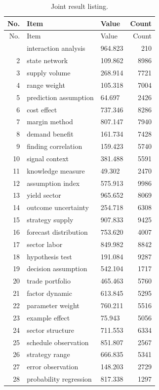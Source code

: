 \documentclass[11pt]{report}
\begin{document}
\begin{longtable}{rllr}\caption{Joint result listing.}\label{tab:l4}\\\toprule No. & Item & Value & Count \\ \midrule \endfirsthead\toprule No. & Item & Value & Count \\ \midrule \endhead\bottomrule \endfoot
1 & interaction analysis & 964.823 & 210 \\
2 & state network & 109.862 & 8986 \\
3 & supply volume & 268.914 & 7721 \\
4 & range weight & 105.318 & 7004 \\
5 & prediction assumption & 64.697 & 2426 \\
6 & cost effect & 737.346 & 8286 \\
7 & margin method & 807.147 & 7940 \\
8 & demand benefit & 161.734 & 7428 \\
9 & finding correlation & 159.423 & 5740 \\
10 & signal context & 381.488 & 5591 \\
11 & knowledge measure & 49.302 & 2470 \\
12 & assumption index & 575.913 & 9986 \\
13 & yield sector & 965.652 & 8069 \\
14 & outcome uncertainty & 254.718 & 6308 \\
15 & strategy supply & 907.833 & 9425 \\
16 & forecast distribution & 753.620 & 4007 \\
17 & sector labor & 849.982 & 8842 \\
18 & hypothesis test & 191.084 & 9287 \\
19 & decision assumption & 542.104 & 1717 \\
20 & trade portfolio & 465.463 & 5760 \\
21 & factor dynamic & 613.845 & 5295 \\
22 & parameter weight & 760.211 & 5516 \\
23 & example effect & 75.943 & 5056 \\
24 & sector structure & 711.553 & 6334 \\
25 & schedule observation & 851.807 & 2567 \\
26 & strategy range & 666.835 & 5341 \\
27 & error observation & 148.203 & 2729 \\
28 & probability regression & 817.338 & 1297 \\

\end{longtable}
\end{document}
